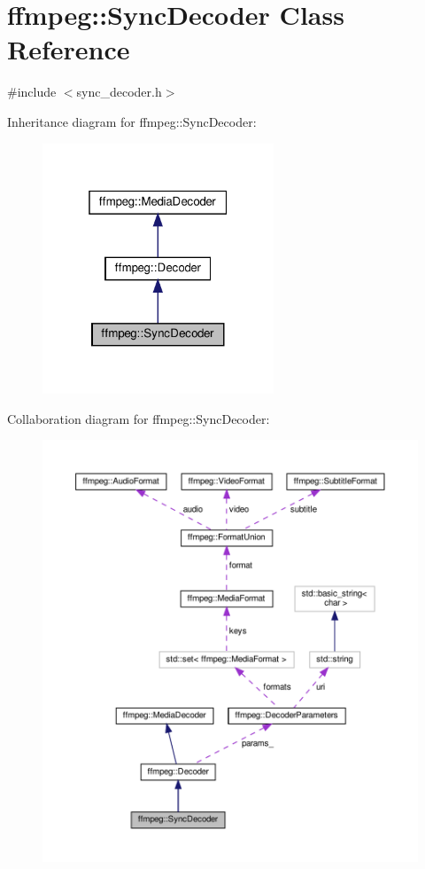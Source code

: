\hypertarget{classffmpeg_1_1SyncDecoder}{}\section{ffmpeg\+:\+:Sync\+Decoder Class Reference}
\label{classffmpeg_1_1SyncDecoder}


{\ttfamily \#include $<$sync\+\_\+decoder.\+h$>$}



Inheritance diagram for ffmpeg\+:\+:Sync\+Decoder\+:
\nopagebreak
\begin{figure}[H]
\begin{center}
\leavevmode
\includegraphics[width=196pt]{classffmpeg_1_1SyncDecoder__inherit__graph}
\end{center}
\end{figure}


Collaboration diagram for ffmpeg\+:\+:Sync\+Decoder\+:
\nopagebreak
\begin{figure}[H]
\begin{center}
\leavevmode
\includegraphics[width=350pt]{classffmpeg_1_1SyncDecoder__coll__graph}
\end{center}
\end{figure}
